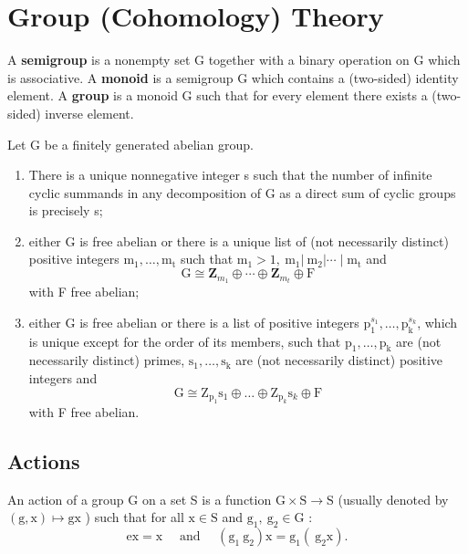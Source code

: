 
\chapter{Group (Cohomology) Theory} 

A \textbf{semigroup} is a nonempty set G together with a binary operation on G which is associative. A \textbf{monoid} is a semigroup G which contains a (two-sided) identity element. A \textbf{group} is a monoid G such that for every element there exists a (two-sided) inverse element.

\begin{theo}
Let G be a finitely generated abelian group.
    \begin{enumerate}
        \item There is a unique nonnegative integer s such that the number of infinite cyclic summands in any decomposition of G as a direct sum of cyclic groups is precisely s;
        \item either G is free abelian or there is a unique list of (not necessarily distinct) positive integers $\mathrm{m}_1, \ldots, \mathrm{m}_{\mathrm{t}}$ such that $\mathrm{m}_1>1, \mathrm{~m}_1\left|\mathrm{~m}_2\right| \cdots \mid \mathrm{m}_{\mathrm{t}}$ and
        $$
        \mathrm{G} \cong \mathbf{Z}_{m_1} \oplus \cdots \oplus \mathbf{Z}_{m_t} \oplus \mathrm{F}
        $$
        with F free abelian;
        \item either G is free abelian or there is a list of positive integers $\mathrm{p}_1^{s_1}, \ldots, \mathrm{p}_{\mathrm{k}}^{s_ k}$, which is unique except for the order of its members, such that $\mathrm{p}_1, \ldots, \mathrm{p}_{\mathrm{k}}$ are (not necessarily distinct) primes, $\mathrm{s}_1, \ldots, \mathrm{s}_{\mathrm{k}}$ are (not necessarily distinct) positive integers and
        $$
        \mathrm{G} \cong \mathrm{Z}_{\mathrm{p}_1} {\mathrm{s}_1} \oplus \ldots \oplus \mathrm{Z}_{\mathrm{p}_k} \mathrm{s}_k \oplus \mathrm{F}
        $$
        with F free abelian.
    \end{enumerate}
\end{theo}



\section{Actions}

\cite{brownCohomologyGroups1982} An action of a group G on a set S is a function $\mathrm{G} \times \mathrm{S} \rightarrow \mathrm{S}$ (usually denoted by $(\mathrm{g}, \mathrm{x}) \mapsto \mathrm{gx}$ ) such that for all $\mathrm{x} \in \mathrm{S}$ and $\mathrm{g}_1, \mathrm{~g}_2 \in \mathrm{G}$ :
$$
\mathrm{ex}=\mathrm{x} \quad \text { and } \quad\left(\mathrm{g}_1 \mathrm{~g}_2\right) \mathrm{x}=\mathrm{g}_1\left(\mathrm{~g}_2 \mathrm{x}\right) .
$$

